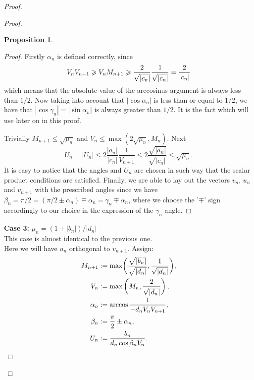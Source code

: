 \documentclass[12pt]{article}
\renewcommand{\leq}{\leqslant}
\renewcommand{\geq}{\geqslant}
\newtheorem{prop}{Proposition}
\theoremstyle{definition}
\numberwithin{remark}{section}
\numberwithin{theorem}{section}
\numberwithin{prop}{section}
\numberwithin{equation}{section}
\numberwithin{lemma}{section}
\numberwithin{prop_under_lemma}{lemma}
\begin{document}
\begin{proof}
\begin{proof}
\begin{prop}
                \end{prop}
                \begin{proof}
                    Firstly $\alpha_n$ is defined correctly, since
                    $$
                    V_n V_{n+1} \geq V_n M_{n+1} \geq \frac{2}{\sqrt{\smash[b]{|c_n|}}} \frac{1}{\sqrt{\smash[b]{|c_n|}}}
                     = \frac{2}{|c_n|}
                    $$
                    which means that the absolute value of the arccosinus argument is always less than $1/2$. Now taking into
                    account that $|\cos{\alpha_n}|$ is less than or equal to $1/2$, we have that $|\cos{\gamma_n}| = |\sin{\alpha_n}|$ is always greater than $1/2$. It is the fact which will use later on in this proof.
                    
                    Trivially $M_{n+1} \leq \sqrt{\mu_n}$ and $V_n \leq \max(2\sqrt{\mu_n}, M_n)$. Next
                    $$
                        U_n = |U_n| \leq 2 \frac{|a_n|}{|c_n|} \frac{1}{V_{n+1}} \leq 2 \frac{\sqrt{|a_n|}}{\sqrt{|c_n|}} \leq \sqrt{\mu_n}.
                    $$
                    It is easy to notice that the angles and $U_n$ are chosen in such way that the scalar product conditions are 
                    satisfied.
                    Finally, we are able to lay out the vectors $v_n$, $u_n$ and $v_{n+1}$ with the prescribed angles 
                    since we have $\beta_n = \pi/2 = (\pi/2 \pm \alpha_n) \mp \alpha_n = \gamma_n \mp \alpha_n$,
                    where we choose the '$\mp$' sign accordingly to our choice in the expression of the $\gamma_n$ angle.
                \end{proof}
            \noindent\textbf{Case 3:} $\mu_n = (1 + |b_n|)/|d_n|$\\
                This case is almost identical to the previous one.\\
                Here we will have $u_n$ orthogonal to $v_{n+1}$.
                Assign:
                \begin{align*}
                    M_{n+1} &:= \max\biggl(\smash[t]{\frac{\sqrt{|b_n|}}{\sqrt{|d_n|}}}, \frac{1}{\sqrt{\smash[b]{|d_n|}}}\biggr),\\
                    V_n &:= \max\left(M_n, \frac{2}{\sqrt{\smash[b]{|d_n|}}}\right),\\
                    \alpha_n &:= \arccos{\frac{1}{-d_n V_n V_{n+1}}},\\
                    \beta_n &:= \frac{\pi}{2} \pm \alpha_n,\\
                    U_n &:= \frac{b_n}{d_n \cos{\beta_n} V_n}.

\end{align*}
\end{proof}
\end{proof}
\end{document}
